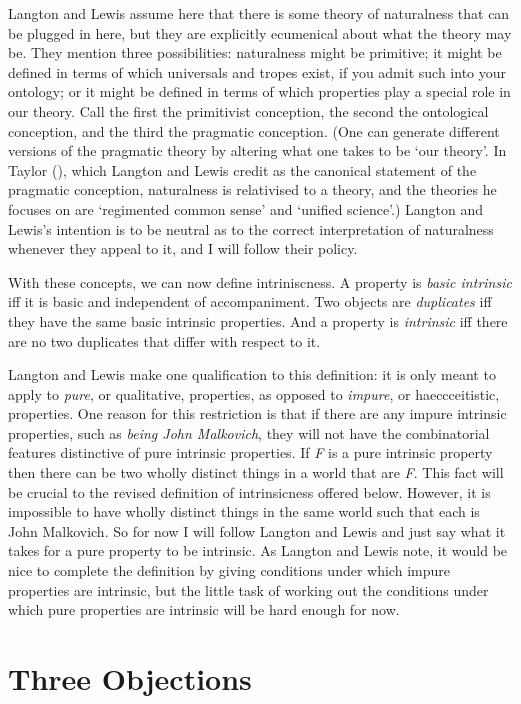 \documentclass[
  11pt,
  letterpaper,
  DIV=11,
  numbers=noendperiod,
  twoside]{scrartcl}
\begin{document}
Langton and Lewis assume here that there is some theory of naturalness
that can be plugged in here, but they are explicitly ecumenical about
what the theory may be. They mention three possibilities: naturalness
might be primitive; it might be defined in terms of which universals and
tropes exist, if you admit such into your ontology; or it might be
defined in terms of which properties play a special role in our theory.
Call the first the primitivist conception, the second the ontological
conception, and the third the pragmatic conception. (One can generate
different versions of the pragmatic theory by altering what one takes to
be `our theory'. In Taylor (), which
Langton and Lewis credit as the canonical statement of the pragmatic
conception, naturalness is relativised to a theory, and the theories he
focuses on are `regimented common sense' and `unified science'.) Langton
and Lewis's intention is to be neutral as to the correct interpretation
of naturalness whenever they appeal to it, and I will follow their
policy.

With these concepts, we can now define intriniscness. A property is
\emph{basic intrinsic} iff it is basic and independent of accompaniment.
Two objects are \emph{duplicates} iff they have the same basic intrinsic
properties. And a property is \emph{intrinsic} iff there are no two
duplicates that differ with respect to it.

Langton and Lewis make one qualification to this definition: it is only
meant to apply to \emph{pure}, or qualitative, properties, as opposed to
\emph{impure}, or haeccceitistic, properties. One reason for this
restriction is that if there are any impure intrinsic properties, such
as \emph{being John Malkovich}, they will not have the combinatorial
features distinctive of pure intrinsic properties. If \emph{F} is a pure
intrinsic property then there can be two wholly distinct things in a
world that are \emph{F}. This fact will be crucial to the revised
definition of intrinsicness offered below. However, it is impossible to
have wholly distinct things in the same world such that each is John
Malkovich. So for now I will follow Langton and Lewis and just say what
it takes for a pure property to be intrinsic. As Langton and Lewis note,
it would be nice to complete the definition by giving conditions under
which impure properties are intrinsic, but the little task of working
out the conditions under which pure properties are intrinsic will be
hard enough for now.

\section{Three Objections}\label{three-objections}
\end{document}
